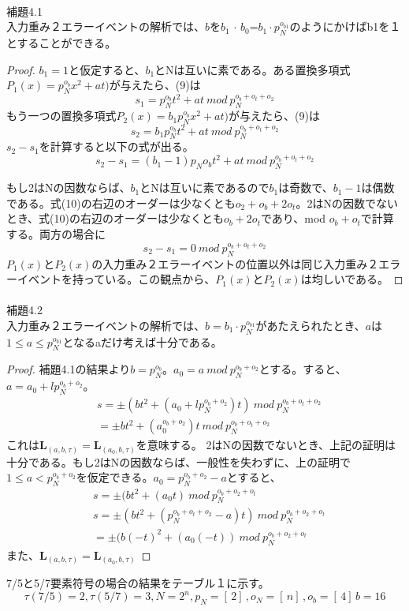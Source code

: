 \documentclass[20 pts]{article}
\begin{document}
\paragraph{}
補題4.1\\
入力重み２エラーイベントの解析では、$b$を$b_1$ $\cdot$  $b_0$=$b_1 \cdot p_N^{o_{b1}}$のようにかけばb1を１とすることができる。

\begin{proof}
$b_1=1$と仮定すると、$b_1$とNは互いに素である。ある置換多項式$P_1(x)=p_N^{o_b} x^2+at) $が与えたら、(9)は$$s_1=p_N^{o_b}t^2 + at \ mod \ p_N^{o_b+o_t+o_2}$$
もう一つの置換多項式$P_2(x)=b_1p_N^{o_b} x^2+at)$が与えたら、(9)は
$$s_2=b_1p_N^{o_b}t^2 + at\ mod \ p_N^{o_b+o_t+o_2}$$
$s_2-s_1$を計算すると以下の式が出る。
\begin{equation}\tag{10}
s_2-s_1=(b_1-1)p_N{o_b}t^2 + at \ mod \ p_N^{o_b+o_t+o_2}
\end{equation}

もし2はNの因数ならば、$b_1$とNは互いに素であるので$b_1$は奇数で、$b_1-1$は偶数である。式(10)の右辺のオーダーは少なくとも$o_2+o_b+2o_t$。2はNの因数でないとき、式(10)の右辺のオーダーは少なくとも$o_b+2o_t$であり、mod $o_b+o_t$で計算する。両方の場合に
$$s_2-s_1=0 \ mod \ p_N^{o_b+o_t+o_2}$$
$P_1(x)$と$P_2(x)$の入力重み２エラーイベントの位置以外は同じ入力重み２エラーイベントを持っている。この観点から、$P_1(x)$と$P_2(x)$は均しいである。
\end{proof}
\paragraph{}
補題4.2\\
入力重み２エラーイベントの解析では、$b= b_1 \cdot p_N^{o_{b1}}$があたえられたとき、$a$は$1\leq a \leq p_N^{o_{b1}}$となるaだけ考えば十分である。

\begin{proof}
補題4.1の結果より$b=p_N^{o_{b}}$。$a_0=a\ mod \ p_N^{o_{b}+o_{2}}$とする。すると、$a=a_0+lp_N^{o_{b}+o_{2}}$。
\begin{equation}\tag{11}
\begin{split}
&s=\pm ({b}t^2 + (a_0+lp_N^{o_{b}+o_{2}})t)\ mod \ p_N^{o_b+o_t+o_2}\\
&=\pm {b}t^2 + (a_0^{o_{b}+o_{2}})t\ mod \ p_N^{o_b+o_t+o_2}
\end{split}
\end{equation}
これは$\mathbf{L}_(a,b,\tau)=\mathbf{L}_(a_0,b,\tau)$を意味する。
2はNの因数でないとき、上記の証明は十分である。もし2はNの因数ならば、一般性を失わずに、上の証明で$1 \leq a < p_N^{o_b+o_2}$を仮定できる。$a_0=p_N^{o_b+o_2}-a$とすると、
\begin{equation}\tag{12}
\begin{split}
&s=\pm ({b}t^2 + (a_0t)\ mod \ p_N^{o_b+o_2+o_t}\\
&s=\pm ({b}t^2 + (p_N^{o_b+o_t+o_2}-a)t)\ mod \ p_N^{o_b+o_2+o_t}\\
&=\pm (b(-t)^2 +(a_0(-t))\ mod \ p_N^{o_b+o_2+o_t}
\end{split}
\end{equation}
また、$\mathbf{L}_(a,b,\tau)=\mathbf{L}_(a_0,b,\tau)$
\end{proof}
7/5と5/7要素符号の場合の結果をテーブル１に示す。
$$\tau(7/5) =2,\tau(5/7) =3,N=2^n,p_N=[\, 2]\,,o_N=[\, n]\,,o_b=[\, 4]\,b=16$$
\end{document}
